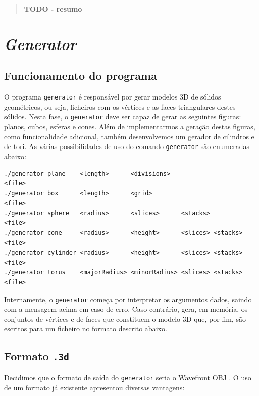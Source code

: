 \documentclass[12pt, a4paper]{article}
\begin{document}
\pagebreak

\begin{abstract}
    \textbf{\color{red} TODO - resumo}
\end{abstract}

\section{\emph{Generator}}

\subsection{Funcionamento do programa}

O programa \texttt{generator} é responsável por gerar modelos 3D de sólidos geométricos, ou seja,
ficheiros com os vértices e as faces triangulares destes sólidos. Nesta fase, o \texttt{generator}
deve ser capaz de gerar as seguintes figuras: planos, cubos, esferas e cones. Além de implementarmos
a geração destas figuras, como funcionalidade adicional, também desenvolvemos um gerador de
cilindros e de tori. As várias possibilidades de uso do comando \texttt{generator} são enumeradas
abaixo:

\begin{verbatim}
./generator plane    <length>      <divisions>                     <file>
./generator box      <length>      <grid>                          <file>
./generator sphere   <radius>      <slices>      <stacks>          <file>
./generator cone     <radius>      <height>      <slices> <stacks> <file>
./generator cylinder <radius>      <height>      <slices> <stacks> <file>
./generator torus    <majorRadius> <minorRadius> <slices> <stacks> <file>
\end{verbatim}

Internamente, o \texttt{generator} começa por interpretar os argumentos dados, saindo com a mensagem
acima em caso de erro. Caso contrário, gera, em memória, os conjuntos de vértices e de faces que
constituem o modelo 3D que, por fim, são escritos para um ficheiro no formato descrito abaixo.

\subsection{Formato \texttt{.3d}}

Decidimos que o formato de saída do \texttt{generator} seria o Wavefront OBJ \cite{wavefront-obj}.
O uso de um formato já existente apresentou diversas vantagens:
\end{document}
